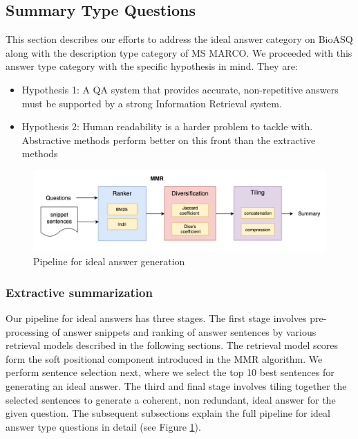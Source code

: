\subsection{Summary Type Questions}
\label{approach1}
This section describes our efforts to address the ideal answer category on BioASQ along with the description type category of MS MARCO. %
We proceeded with this answer type category with the specific hypothesis in mind. They are:
\begin{itemize}
\item Hypothesis 1: A QA system that provides accurate, non-repetitive answers must be supported by a strong Information Retrieval system.
\item Hypothesis 2: Human readability is a harder problem to tackle with. Abstractive methods perform better on this front than the extractive methods	\end{itemize}


 \begin{figure}
     \centering
     \includegraphics[scale=0.3]{images/pipeline_summary.png}
     \caption{Pipeline for ideal answer generation}
     \label{fig:ideal_answers_pipeline}
 \end{figure}
\subsubsection{Extractive summarization}
Our pipeline for ideal answers has three stages. The first stage involves pre-processing of answer snippets and ranking of answer sentences by various retrieval models described in the following sections. The retrieval model scores form the soft positional component introduced in the MMR algorithm. We perform sentence selection next, where we select the top 10 best sentences for generating an ideal answer. The third and final stage involves tiling together the selected sentences to generate a coherent, non redundant, ideal answer for the given question. 
The subsequent subsections explain the full pipeline for ideal answer type questions in detail (see Figure \ref{fig:ideal_answers_pipeline}).

